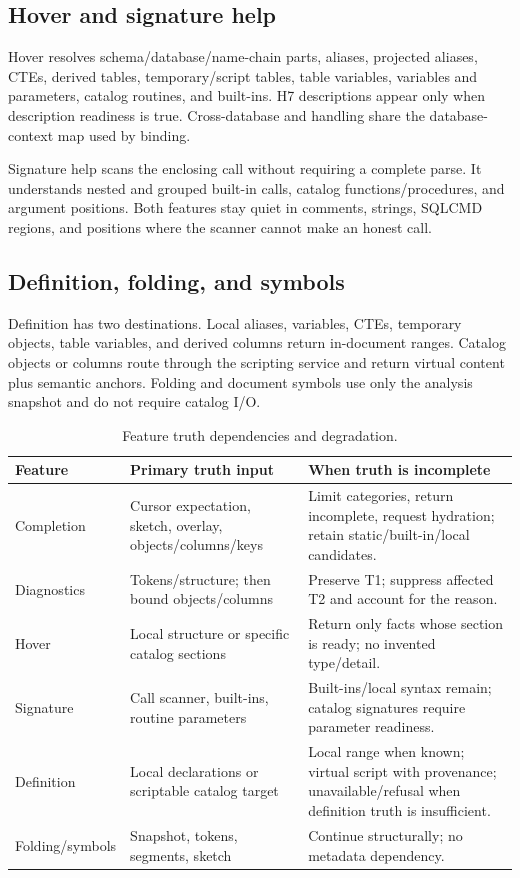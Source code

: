 \documentclass[11pt]{article}
\newcommand{\code}[1]{\texttt{\detokenize{#1}}}
\begin{document}
\subsection{Hover and signature help}

Hover resolves schema/database/name-chain parts, aliases, projected aliases, CTEs, derived tables, temporary/script tables, table variables, variables and parameters, catalog routines, and built-ins. H7 descriptions appear only when description readiness is true. Cross-database and \code{USE} handling share the database-context map used by binding.

Signature help scans the enclosing call without requiring a complete parse. It understands nested and grouped built-in calls, catalog functions/procedures, and \code{EXEC} argument positions. Both features stay quiet in comments, strings, SQLCMD regions, and positions where the scanner cannot make an honest call.

\subsection{Definition, folding, and symbols}

Definition has two destinations. Local aliases, variables, CTEs, temporary objects, table variables, and derived columns return in-document ranges. Catalog objects or columns route through the scripting service and return virtual content plus semantic anchors. Folding and document symbols use only the analysis snapshot and do not require catalog I/O.

\begin{table}[H]
\centering
\small
\caption{Feature truth dependencies and degradation.}
\label{tab:truth}
\begin{tabularx}{\textwidth}{@{}p{}p{}X@{}}
\toprule
\textbf{Feature} & \textbf{Primary truth input} & \textbf{When truth is incomplete}\\
\midrule
Completion & Cursor expectation, sketch, overlay, objects/columns/keys & Limit categories, return incomplete, request hydration; retain static/built-in/local candidates.\\
Diagnostics & Tokens/structure; then bound objects/columns & Preserve T1; suppress affected T2 and account for the reason.\\
Hover & Local structure or specific catalog sections & Return only facts whose section is ready; no invented type/detail.\\
Signature & Call scanner, built-ins, routine parameters & Built-ins/local syntax remain; catalog signatures require parameter readiness.\\
Definition & Local declarations or scriptable catalog target & Local range when known; virtual script with provenance; unavailable/refusal when definition truth is insufficient.\\
Folding/symbols & Snapshot, tokens, segments, sketch & Continue structurally; no metadata dependency.\\
\bottomrule
\end{tabularx}
\end{table}
\end{document}
